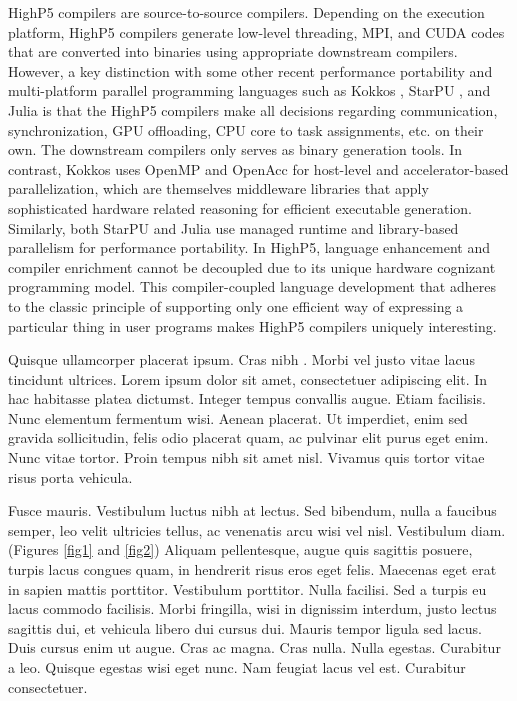 \documentclass[ASNA,twocolumn]{USG} %
\begin{document}
{HighP5 compilers are source-to-source compilers. Depending on the execution platform, HighP5 compilers generate low-level threading, MPI, and CUDA codes that are converted into binaries using appropriate downstream compilers. However, a key distinction with some other recent performance portability and multi-platform parallel programming languages such as Kokkos \citep{trott2021kokkos}, StarPU \citep{augonnet2009starpu}, and Julia \citep{lin2021comparing} is that the HighP5 compilers make all decisions regarding communication, synchronization, GPU offloading, CPU core to task assignments, etc. on their own. The downstream compilers only serves as binary generation tools. In contrast, Kokkos uses OpenMP \citep{gayatri2023kokkos} and OpenAcc \citep{valero2022kokkacc} for host-level and accelerator-based parallelization, which are themselves middleware libraries that apply sophisticated hardware related reasoning for efficient executable generation. Similarly, both StarPU and Julia \citep{teichgraber2022julia} use managed runtime and library-based parallelism for performance portability. In HighP5, language enhancement and compiler enrichment cannot be decoupled due to its unique hardware cognizant programming model. This compiler-coupled language development that adheres to the classic principle of supporting only one efficient way of expressing a particular thing in user programs \citep{wirth1974design} makes HighP5 compilers uniquely interesting.   
	
	


Quisque ullamcorper placerat ipsum. Cras nibh \cite{Benson1992,Hirt1974}. Morbi vel justo vitae lacus tincidunt ultrices. Lorem ipsum dolor sit
amet, consectetuer adipiscing elit. In hac habitasse platea dictumst. Integer tempus convallis augue. Etiam facilisis.
Nunc elementum fermentum wisi. Aenean placerat. Ut imperdiet, enim sed gravida sollicitudin, felis odio placerat
quam, ac pulvinar elit purus eget enim. Nunc vitae tortor. Proin tempus nibh sit amet nisl. Vivamus quis tortor
vitae risus porta vehicula.

Fusce mauris. Vestibulum luctus nibh at lectus. Sed bibendum, nulla a faucibus semper, leo velit ultricies tellus, ac
venenatis arcu wisi vel nisl. Vestibulum diam. (Figures \ref{fig1} and \ref{fig2}) Aliquam pellentesque, augue quis sagittis posuere, turpis lacus congues
quam, in hendrerit risus eros eget felis. Maecenas eget erat in sapien mattis porttitor. Vestibulum porttitor. Nulla facilisi. Sed a turpis eu lacus commodo facilisis. Morbi fringilla, wisi in dignissim interdum, justo lectus sagittis dui, et
vehicula libero dui cursus dui. Mauris tempor ligula sed lacus. Duis cursus enim ut augue. Cras ac magna. Cras nulla.
Nulla egestas. Curabitur a leo. Quisque egestas wisi eget nunc. Nam feugiat lacus vel est. Curabitur consectetuer.

}
\end{document}
